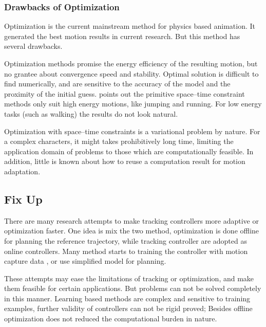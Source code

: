 \subsubsection*{Drawbacks of Optimization}
Optimization is the current mainstream method for physics based animation.
It generated the best motion results in current research.
But this method has several drawbacks.

\begin{itemize}
Optimization methods promise the energy efficiency of the resulting motion, but no grantee about convergence speed and stability.
Optimal solution is difficult to find numerically, and are sensitive to the accuracy of the model and the proximity of the initial guess.
\citet{Liu2005} points out the primitive space–time constraint methods only suit high energy motions, like jumping and running.
For low energy tasks (such as walking) the results do not look natural.

Optimization with space–time constraints is a variational problem by nature. 
For a complex characters, it might takes  prohibitively long time, limiting the application domain of problems to those which are computationally feasible. 
In addition, little is known about how to reuse a computation result for motion adaptation.
\end{itemize}


\subsection{Fix Up}
There are many research attempts to make tracking controllers more adaptive or optimization faster.
One idea is mix the two method, optimization is done offline for planning the reference trajectory, while tracking controller are adopted as online controllers.
Many method starts to training the controller with motion capture data \citep{levine2011space,coros2010generalized,de2010feature,wei2011physically,ye2010optimal,lee2010motion,wang2010optimizing,wu2010terrain,liu2010sampling,lee2010data}, or use simplified model for planning\citep{mordatch2010robust}.


These attempts may ease the limitations of tracking or optimization, and make them feasible for certain applications.
But \cms problems can not be solved completely in this manner.
Learning based methods are complex and  sensitive to training examples, further validity of controllers can not be rigid proved;
Besides  offline optimization  does not reduced the computational burden in nature.




